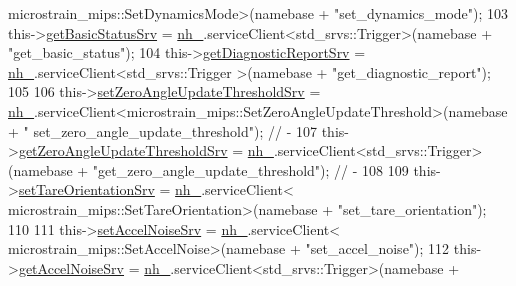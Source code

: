 \begin{DoxyCode}
      microstrain\_mips::SetDynamicsMode>(namebase + \textcolor{stringliteral}{"set\_dynamics\_mode"});
103                 this->\hyperlink{classcl__microstrain__mips_1_1ClMicrostainMips_ab2d9efccc6237800a890135a4249eaf8}{getBasicStatusSrv} = \hyperlink{classcl__microstrain__mips_1_1ClMicrostainMips_a5a39ba0864ba2c4c003b6ea427538243}{nh\_}.serviceClient<std\_srvs::Trigger>(namebase
       + \textcolor{stringliteral}{"get\_basic\_status"});
104                 this->\hyperlink{classcl__microstrain__mips_1_1ClMicrostainMips_a3d4329c798aa4b7cab1320f35f270192}{getDiagnosticReportSrv} = \hyperlink{classcl__microstrain__mips_1_1ClMicrostainMips_a5a39ba0864ba2c4c003b6ea427538243}{nh\_}.serviceClient<std\_srvs::Trigger
      >(namebase + \textcolor{stringliteral}{"get\_diagnostic\_report"});
105 
106                 this->\hyperlink{classcl__microstrain__mips_1_1ClMicrostainMips_a88ffc1e573993764bb130c97cc64fe08}{setZeroAngleUpdateThresholdSrv} = 
      \hyperlink{classcl__microstrain__mips_1_1ClMicrostainMips_a5a39ba0864ba2c4c003b6ea427538243}{nh\_}.serviceClient<microstrain\_mips::SetZeroAngleUpdateThreshold>(namebase + \textcolor{stringliteral}{"
      set\_zero\_angle\_update\_threshold"}); \textcolor{comment}{//  -}
107                 this->\hyperlink{classcl__microstrain__mips_1_1ClMicrostainMips_ae720970f4114e7b6524b59df405ede83}{getZeroAngleUpdateThresholdSrv} = 
      \hyperlink{classcl__microstrain__mips_1_1ClMicrostainMips_a5a39ba0864ba2c4c003b6ea427538243}{nh\_}.serviceClient<std\_srvs::Trigger>(namebase + \textcolor{stringliteral}{"get\_zero\_angle\_update\_threshold"});                     
              \textcolor{comment}{//  -}
108 
109                 this->\hyperlink{classcl__microstrain__mips_1_1ClMicrostainMips_affd28a64d0ee9bcdb116d974f5e19ec6}{setTareOrientationSrv} = \hyperlink{classcl__microstrain__mips_1_1ClMicrostainMips_a5a39ba0864ba2c4c003b6ea427538243}{nh\_}.serviceClient<
      microstrain\_mips::SetTareOrientation>(namebase + \textcolor{stringliteral}{"set\_tare\_orientation"});
110 
111                 this->\hyperlink{classcl__microstrain__mips_1_1ClMicrostainMips_aed9dd96ff81966ea1fce03173a05bcd8}{setAccelNoiseSrv} = \hyperlink{classcl__microstrain__mips_1_1ClMicrostainMips_a5a39ba0864ba2c4c003b6ea427538243}{nh\_}.serviceClient<
      microstrain\_mips::SetAccelNoise>(namebase + \textcolor{stringliteral}{"set\_accel\_noise"});
112                 this->\hyperlink{classcl__microstrain__mips_1_1ClMicrostainMips_ae34d6cfd5e2e990d2fa3afab20ca9c01}{getAccelNoiseSrv} = \hyperlink{classcl__microstrain__mips_1_1ClMicrostainMips_a5a39ba0864ba2c4c003b6ea427538243}{nh\_}.serviceClient<std\_srvs::Trigger>(namebase +

\end{DoxyCode}
